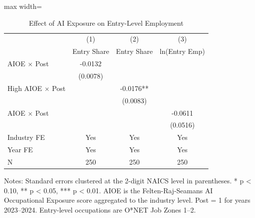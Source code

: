 \begin{table}[htbp]
\centering
\caption{Effect of AI Exposure on Entry-Level Employment}
\label{tab:main}
\begin{adjustbox}{max width=\textwidth}
\begin{tabular}{lccc}
\hline\hline
 & (1) & (2) & (3) \\
 & Entry Share & Entry Share & ln(Entry Emp) \\
\hline
AIOE $\times$ Post & -0.0132 & & \\
 & (0.0078) & & \\
High AIOE $\times$ Post & & -0.0176** & \\
 & & (0.0083) & \\
AIOE $\times$ Post & & & -0.0611 \\
 & & & (0.0516) \\
\hline
Industry FE & Yes & Yes & Yes \\
Year FE & Yes & Yes & Yes \\
N & 250 & 250 & 250 \\
\hline\hline
\end{tabular}
\end{adjustbox}
\begin{tablenotes}\small
\item Notes: Standard errors clustered at the 2-digit NAICS level in parentheses.
* p < 0.10, ** p < 0.05, *** p < 0.01.
AIOE is the Felten-Raj-Seamans AI Occupational Exposure score aggregated to the industry level.
Post = 1 for years 2023--2024. Entry-level occupations are O*NET Job Zones 1--2.
\end{tablenotes}
\end{table}
